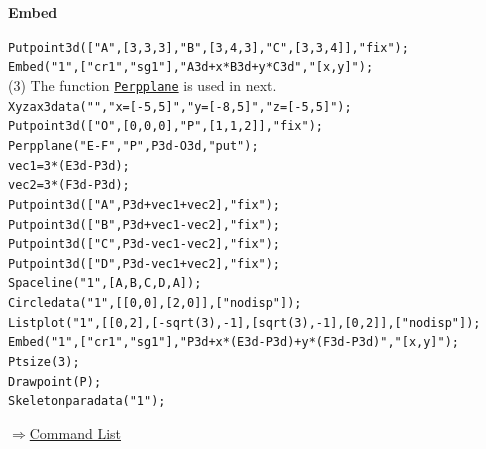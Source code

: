 \documentclass[papersize,a4paper,12pt]{article}
\newenvironment{cmd}[2]{
\hypertarget{#2}{}
\begin{center}{\bf\large #1}\end{center}
\begin{description}
}{
\end{description}
\begin{flushright} \hyperlink{functionlist}{$\Rightarrow$Command List}\end{flushright}
}
\begin{document}
\begin{cmd}{Embed}{embed}
\verb|Putpoint3d(["A",[3,3,3],"B",[3,4,3],"C",[3,3,4]],"fix");|\\
\verb|Embed("1",["cr1","sg1"],"A3d+x*B3d+y*C3d","[x,y]");|\\

(3) The function {\tt \hyperlink{perpplane}{Perpplane}} is used in next.\\
\verb|Xyzax3data("","x=[-5,5]","y=[-8,5]","z=[-5,5]");|\\
\verb|Putpoint3d(["O",[0,0,0],"P",[1,1,2]],"fix");|\\
\verb|Perpplane("E-F","P",P3d-O3d,"put");|\\
\verb|vec1=3*(E3d-P3d);|\\
\verb|vec2=3*(F3d-P3d);|\\
\verb|Putpoint3d(["A",P3d+vec1+vec2],"fix");|\\
\verb|Putpoint3d(["B",P3d+vec1-vec2],"fix");|\\
\verb|Putpoint3d(["C",P3d-vec1-vec2],"fix");|\\
\verb|Putpoint3d(["D",P3d-vec1+vec2],"fix");|\\
\verb|Spaceline("1",[A,B,C,D,A]);|\\
\verb|Circledata("1",[[0,0],[2,0]],["nodisp"]);|\\
\verb|Listplot("1",[[0,2],[-sqrt(3),-1],[sqrt(3),-1],[0,2]],["nodisp"]);|\\
\verb|Embed("1",["cr1","sg1"],"P3d+x*(E3d-P3d)+y*(F3d-P3d)","[x,y]");|\\
\verb|Ptsize(3);|\\
\verb|Drawpoint(P);|\\
\verb|Skeletonparadata("1");|
         \begin{center}  \end{center}
\end{cmd}

\end{document}
